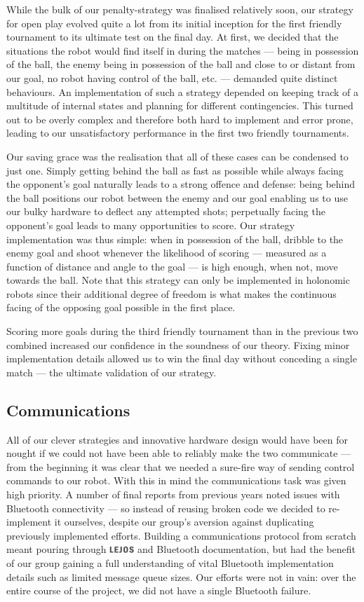\documentclass[journal,a4paper,12pt]{IEEEtran}
\newcommand*{\LEJOS}{\includegraphics[height=8pt]{lejos.png}\xspace}
\begin{document}
While the bulk of our penalty-strategy was finalised relatively soon, our strategy for open play evolved quite a lot from its initial inception for the first friendly tournament to its ultimate test on the final day. At first, we decided that the situations the robot would find itself in during the matches --- being in possession of the ball, the enemy being in possession of the ball and close to or distant from our goal, no robot having control of the ball, etc. --- demanded quite distinct behaviours. An implementation of such a strategy depended on keeping track of a multitude of internal states and planning for different contingencies. This turned out to be overly complex and therefore both hard to implement and error prone, leading to our unsatisfactory performance in the first two friendly tournaments.

Our saving grace was the realisation that all of these cases can be condensed to just one. Simply getting behind the ball as fast as possible while always facing the opponent's goal naturally leads to a strong offence and defense: being behind the ball positions our robot between the enemy and our goal enabling us to use our bulky hardware to deflect any attempted shots; perpetually facing the opponent's goal leads to many opportunities to score. Our strategy implementation was thus simple: when in possession of the ball, dribble to the enemy goal and shoot whenever the likelihood of scoring --- measured as a function of distance and angle to the goal --- is high enough, when not, move towards the ball. Note that this strategy can only be implemented in holonomic robots since their additional degree of freedom is what makes the continuous facing of the opposing goal possible in the first place.

Scoring more goals during the third friendly tournament than in the previous two combined increased our confidence in the soundness of our theory. Fixing minor implementation details allowed us to win the final day without conceding a single match --- the ultimate validation of our strategy.


\subsection{Communications}\label{s:communications}

All of our clever strategies and innovative hardware design would have been for nought if we could not have been able to reliably make the two communicate --- from the beginning it was clear that we needed a sure-fire way of sending control commands to our robot. With this in mind the communications task was given high priority. A number of final reports from previous years noted issues with Bluetooth connectivity --- so instead of reusing broken code we decided to re-implement it ourselves, despite our group's aversion against duplicating previously implemented efforts. Building a communications protocol from scratch meant pouring through \LEJOS and Bluetooth documentation, but had the benefit of our group gaining a full understanding of vital Bluetooth implementation details such as limited message queue sizes. Our efforts were not in vain: over the entire course of the project, we did not have a single Bluetooth failure.
\end{document}
